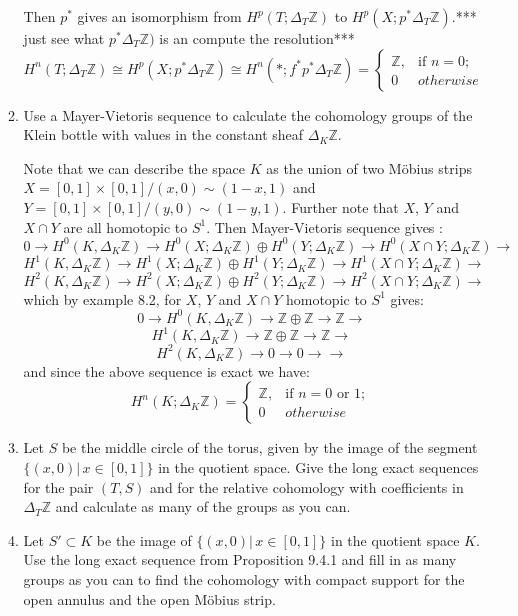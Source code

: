 \documentclass{article}
\newcommand{\zed}{\mathbb Z}
\begin{document}
\begin{enumerate}
\begin{enumerate}
Then $p^*$ gives an isomorphism from $H^p(T; \Delta_T\mathbb{Z})$ to $H^p(X; p^*\Delta_T\mathbb{Z})$.*** just see what $p^*\Delta_T\mathbb{Z})$ is an compute the resolution***%
\[
H^n(T; \Delta_T\mathbb{Z}) \cong H^p(X; p^*\Delta_T\mathbb{Z}) \cong H^n({*};f^*p^*\Delta_T\mathbb{Z}) = \begin{cases}
\mathbb{Z}, & \text{if } n=0;\\
0 & otherwise  
\end{cases}
\]
\item Use a Mayer-Vietoris sequence to calculate the cohomology groups of the Klein bottle with values in the constant sheaf $\Delta_K\zed$. 

Note that we can describe the space $K$ as the union of two M\"obius strips $X = [0,1]\times[0,1]/(x, 0) \sim (1 − x, 1)$ and $Y =  [0,1]\times[0,1]/(y, 0) \sim (1 − y, 1)$. Further note that $X$, $Y$ and $X \cap Y$ are all homotopic to $S^1$. Then Mayer-Vietoris sequence gives :
\[0 \rightarrow H^0(K, \Delta_K\mathbb{Z}) \rightarrow H^0(X;\Delta_K\mathbb{Z}) \oplus H^0(Y;\Delta_K\mathbb{Z}) \rightarrow H^0(X \cap Y; \Delta_K\mathbb{Z}) \rightarrow\]
 \[H^1(K, \Delta_K\mathbb{Z}) \rightarrow H^1(X;\Delta_K\mathbb{Z}) \oplus H^1(Y;\Delta_K\mathbb{Z}) \rightarrow H^1(X \cap Y; \Delta_K\mathbb{Z}) \rightarrow  \]
\[H^2(K, \Delta_K\mathbb{Z}) \rightarrow H^2(X;\Delta_K\mathbb{Z}) \oplus H^2(Y;\Delta_K\mathbb{Z}) \rightarrow H^2(X \cap Y; \Delta_K\mathbb{Z}) \rightarrow  \]
which by example 8.2, for $X$, $Y$ and $X \cap Y$ homotopic to $S^1$ gives:
\[0 \rightarrow H^0(K, \Delta_K\mathbb{Z}) \rightarrow \mathbb{Z} \oplus \mathbb{Z} \rightarrow \mathbb{Z} \rightarrow\]
\[H^1(K, \Delta_K\mathbb{Z}) \rightarrow \mathbb{Z} \oplus \mathbb{Z} \rightarrow \mathbb{Z} \rightarrow \]
\[H^2(K, \Delta_K\mathbb{Z}) \rightarrow 0 \rightarrow 0 \rightarrow \rightarrow \]
and since the above sequence is exact we have:
\[
H^n(K; \Delta_K\mathbb{Z}) = \begin{cases}
\mathbb{Z}, & \text{if } n=0 \text{ or } 1;\\

0 & otherwise  
\end{cases}
\]


\item
Let $S$ be the middle circle of the torus, given by the image of the segment $\{(x,0)|\,x\in[0,1]\}$ in the quotient space. Give the long exact sequences for the pair $(T,S)$ 
and for the relative cohomology with coefficients in $\Delta_T\zed$ and calculate as many of the groups as you can.
\item
Let $S'\subset K$ be the image of $\{(x,0)|\,x\in[0,1]\}$ in the quotient space $K$.
Use the long exact sequence from Proposition 9.4.1 and fill in as many groups as you can to find the cohomology with compact support for 
the open annulus and the open M\"obius strip.
\end{enumerate}


\end{enumerate}
\end{document}
